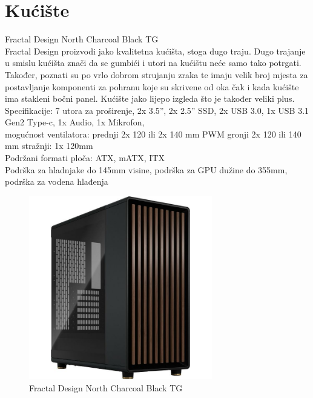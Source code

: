 \documentclass{report}
\begin{document}
\chapter{Kućište}
Fractal Design North Charcoal Black TG
\\Fractal Design proizvodi jako kvalitetna kućišta, stoga dugo traju. Dugo trajanje u smislu kućišta znači da se gumbići i utori na kućištu neće samo tako potrgati. Također, poznati su po vrlo dobrom strujanju zraka te imaju velik broj mjesta za postavljanje komponenti za pohranu koje su skrivene od oka čak i kada kućište ima stakleni bočni panel. Kućište jako lijepo izgleda što je također veliki plus.
\\Specifikacije:
7 utora za proširenje, 2x 3.5”, 2x 2.5” SSD, 2x USB 3.0, 1x USB 3.1 Gen2 Type-c, 1x Audio, 1x Mikrofon, 
\\mogućnost ventilatora: 
prednji 2x 120 ili 2x 140 mm PWM
gronji 2x 120 ili 140 mm
stražnji: 1x 120mm
\\Podržani formati ploča: ATX, mATX, ITX
\\Podrška za hladnjake do 145mm visine, podrška za GPU dužine do 355mm, podrška za vodena hlađenja
\begin{figure}[h]
\includegraphics[width=8cm]{Kućište.jpg}
\caption{Fractal Design North Charcoal Black TG}
\end{figure}
\end{document}
